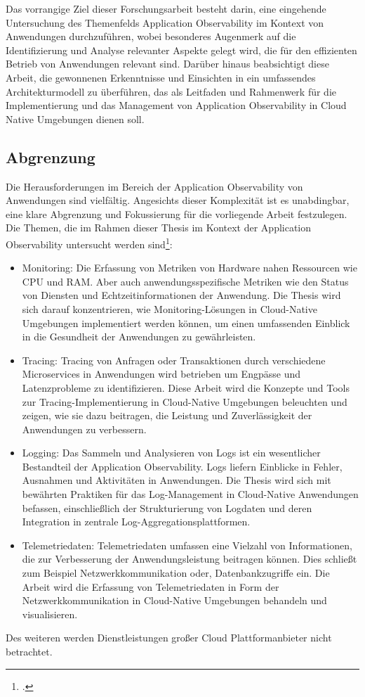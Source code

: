 Das vorrangige Ziel dieser Forschungsarbeit besteht darin, eine eingehende Untersuchung des Themenfelds Application Observability im Kontext von \cn Anwendungen durchzuführen, wobei besonderes Augenmerk auf die Identifizierung und Analyse relevanter Aspekte gelegt wird, die für den effizienten Betrieb von Anwendungen relevant sind. Darüber hinaus beabsichtigt diese Arbeit, die gewonnenen Erkenntnisse und Einsichten in ein umfassendes Architekturmodell zu überführen, das als Leitfaden und Rahmenwerk für die Implementierung und das Management von Application Observability in Cloud Native Umgebungen dienen soll.

\subsection{Abgrenzung}\label{lab:Abgrenzung}
Die Herausforderungen im Bereich der Application Observability von \cn Anwendungen sind vielfältig. Angesichts dieser Komplexität ist es unabdingbar, eine klare Abgrenzung und Fokussierung für die vorliegende Arbeit festzulegen. Die Themen, die im Rahmen dieser Thesis im Kontext der Application Observability untersucht werden sind\footcite[Vgl.][S.5]{Pourmajidi2023}:
\begin{itemize}
	\item Monitoring: Die Erfassung von Metriken von Hardware nahen Ressourcen wie CPU und RAM. Aber auch anwendungsspezifische Metriken wie den Status von Diensten und Echtzeitinformationen der Anwendung. Die Thesis wird sich darauf konzentrieren, wie Monitoring-Lösungen in Cloud-Native Umgebungen implementiert werden können, um einen umfassenden Einblick in die Gesundheit der Anwendungen zu gewährleisten.
	\item Tracing: Tracing von Anfragen oder Transaktionen durch verschiedene Microservices in \cn Anwendungen wird betrieben um Engpässe und Latenzprobleme zu identifizieren. Diese Arbeit wird die Konzepte und Tools zur Tracing-Implementierung in Cloud-Native Umgebungen beleuchten und zeigen, wie sie dazu beitragen, die Leistung und Zuverlässigkeit der Anwendungen zu verbessern.
	\item Logging: Das Sammeln und Analysieren von Logs ist ein wesentlicher Bestandteil der Application Observability. Logs liefern Einblicke in Fehler, Ausnahmen und Aktivitäten in Anwendungen. Die Thesis wird sich mit bewährten Praktiken für das Log-Management in Cloud-Native Anwendungen befassen, einschließlich der Strukturierung von Logdaten und deren Integration in zentrale Log-Aggregationsplattformen.
	\item Telemetriedaten: Telemetriedaten umfassen eine Vielzahl von Informationen, die zur Verbesserung der Anwendungsleistung beitragen können. Dies schließt zum Beispiel Netzwerkkommunikation oder, Datenbankzugriffe ein. Die Arbeit wird die Erfassung von Telemetriedaten in Form der Netzwerkkommunikation in Cloud-Native Umgebungen behandeln und visualisieren.
\end{itemize}
Des weiteren werden Dienstleistungen großer Cloud Plattformanbieter nicht betrachtet.

